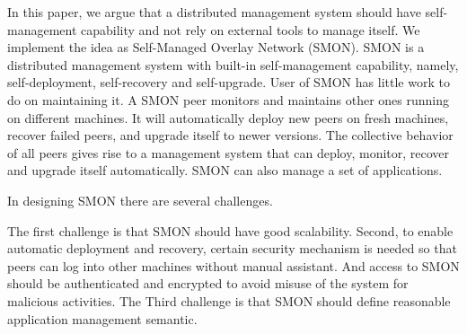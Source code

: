 In this paper, we argue that a distributed management system
should have self-management capability and not rely on
external tools to manage itself. We implement the idea as
Self-Managed Overlay Network (SMON). SMON is a distributed
management system with built-in self-management capability,
namely, self-deployment, self-recovery and self-upgrade.
User of SMON has little work to do on maintaining it. A SMON
peer monitors and maintains other ones running on different
machines. It will automatically deploy new peers on fresh
machines, recover failed peers, and upgrade itself to newer
versions. The collective behavior of all peers gives rise to
a management system that can deploy, monitor, recover and
upgrade itself automatically. SMON can also manage a set of
applications.





In designing SMON there are several challenges.

The first challenge is that SMON should have good
scalability. Second, to enable automatic deployment and
recovery, certain security mechanism is needed so that peers
can log into other machines without manual assistant. And
access to SMON should be authenticated and encrypted to
avoid misuse of the system for malicious activities. The
Third challenge is that SMON should define reasonable
application management semantic.

